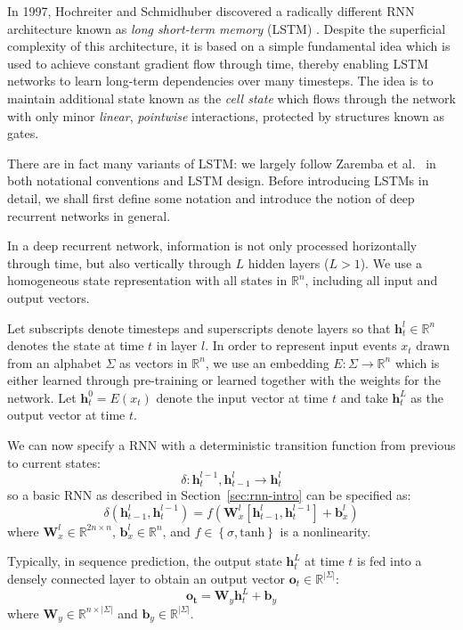 \documentclass[12pt,a4paper,twoside,openright]{report}
\newcommand{\set}[1]{ \left\{ #1 \right\} }
\newcommand{\vect}[1]{\boldsymbol{\mathbf{#1}}}
\begin{document}
In 1997, Hochreiter and Schmidhuber discovered a radically different RNN
architecture known as \emph{long short-term memory} (LSTM)
\cite{hochreiter1997long}. Despite the superficial complexity of this
architecture, it is based on a simple fundamental idea which is used to achieve
constant gradient flow through time, thereby enabling LSTM networks to learn
long-term dependencies over many timesteps. The idea is to maintain additional
state known as the \emph{cell state} which flows through the network with only
minor \emph{linear}, \emph{pointwise} interactions, protected by structures
known as gates. 

There are in fact many variants of LSTM: we largely follow Zaremba et al.\
\cite{zaremba2014recurrent} in both notational conventions and LSTM design.
Before introducing LSTMs in detail, we shall first define some notation and
introduce the notion of deep recurrent networks in general.

In a deep recurrent network, information is not only processed horizontally
through time, but also vertically through $L$ hidden layers ($L > 1$). We use a
homogeneous state representation with all states in $\mathbb{R}^n$, including
all input and output vectors. 

Let subscripts denote timesteps and superscripts denote layers so that
$\vect{h}_t^l \in \mathbb{R}^n$ denotes the state at time $t$ in layer $l$. In
order to represent input events $x_t$ drawn from an alphabet $\Sigma$ as vectors
in $\mathbb{R}^n$, we use an embedding $E : \Sigma \rightarrow \mathbb{R}^n$
which is either learned through pre-training or learned together with the
weights for the network. Let $\vect{h}_t^0 = E(x_t)$ denote the input vector at
time $t$ and take $\vect{h}_t^L$ as the output vector at time $t$.

We can now specify a RNN with a deterministic transition function from previous
to current states:
$$ \delta : \vect{h}_t^{l-1}, \vect{h}_{t-1}^l \rightarrow \vect{h}_t^l $$
so a basic RNN as described in Section~\ref{sec:rnn-intro} can be specified as:
$$ \delta(\vect{h}_{t-1}^l, \vect{h}_t^{l-1}) = f(\vect{W}^l_x [\vect{h}_{t-1}^l,
\vect{h}_t^{l-1}] + \vect{b}^l_x) $$
where $\vect{W}^l_x \in \mathbb{R}^{2n \times n}$, $\vect{b}^l_x \in
\mathbb{R}^n$, and $f \in \set{ \sigma, \mathrm{tanh} }$ is a nonlinearity.

Typically, in sequence prediction, the output state $\vect{h}_t^L$ at time $t$
is fed into a densely connected layer to obtain an output vector $\vect{o}_t \in
\mathbb{R}^{|\Sigma|}$:
$$ \vect{o_t} = \vect{W}_y \vect{h}_t^L + \vect{b}_y $$
where $\vect{W}_y \in \mathbb{R}^{n \times |\Sigma|}$ and $\vect{b}_y \in
\mathbb{R}^{|\Sigma|}$. 
\end{document}
